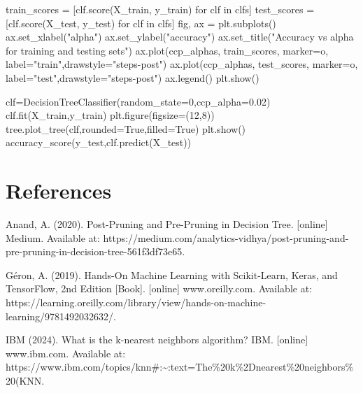 \documentclass[
  letterpaper,
  DIV=11,
  numbers=noendperiod]{scrartcl}
\newenvironment{Shaded}{\begin{snugshade}}{\end{snugshade}}
\newcommand{\ControlFlowTok}[1]{\textcolor[rgb]{0.00,0.23,0.31}{#1}}
\newcommand{\DecValTok}[1]{\textcolor[rgb]{0.68,0.00,0.00}{#1}}
\newcommand{\FloatTok}[1]{\textcolor[rgb]{0.68,0.00,0.00}{#1}}
\newcommand{\KeywordTok}[1]{\textcolor[rgb]{0.00,0.23,0.31}{#1}}
\newcommand{\NormalTok}[1]{\textcolor[rgb]{0.00,0.23,0.31}{#1}}
\newcommand{\OperatorTok}[1]{\textcolor[rgb]{0.37,0.37,0.37}{#1}}
\newcommand{\StringTok}[1]{\textcolor[rgb]{0.13,0.47,0.30}{#1}}
\newcommand{\VariableTok}[1]{\textcolor[rgb]{0.07,0.07,0.07}{#1}}
\begin{document}
\begin{Shaded}
\begin{Highlighting}[]
\NormalTok{train\_scores }\OperatorTok{=}\NormalTok{ [clf.score(X\_train, y\_train) }\ControlFlowTok{for}\NormalTok{ clf }\KeywordTok{in}\NormalTok{ clfs]}
\NormalTok{test\_scores }\OperatorTok{=}\NormalTok{ [clf.score(X\_test, y\_test) }\ControlFlowTok{for}\NormalTok{ clf }\KeywordTok{in}\NormalTok{ clfs]}
\NormalTok{fig, ax }\OperatorTok{=}\NormalTok{ plt.subplots()}
\NormalTok{ax.set\_xlabel(}\StringTok{"alpha"}\NormalTok{)}
\NormalTok{ax.set\_ylabel(}\StringTok{"accuracy"}\NormalTok{)}
\NormalTok{ax.set\_title(}\StringTok{"Accuracy vs alpha for training and testing sets"}\NormalTok{)}
\NormalTok{ax.plot(ccp\_alphas, train\_scores, marker}\OperatorTok{=}\StringTok{\textquotesingle{}o\textquotesingle{}}\NormalTok{, label}\OperatorTok{=}\StringTok{"train"}\NormalTok{,drawstyle}\OperatorTok{=}\StringTok{"steps{-}post"}\NormalTok{)}
\NormalTok{ax.plot(ccp\_alphas, test\_scores, marker}\OperatorTok{=}\StringTok{\textquotesingle{}o\textquotesingle{}}\NormalTok{, label}\OperatorTok{=}\StringTok{"test"}\NormalTok{,drawstyle}\OperatorTok{=}\StringTok{"steps{-}post"}\NormalTok{)}
\NormalTok{ax.legend()}
\NormalTok{plt.show()}
\end{Highlighting}
\end{Shaded}

\begin{Shaded}
\begin{Highlighting}[]
\NormalTok{clf}\OperatorTok{=}\NormalTok{DecisionTreeClassifier(random\_state}\OperatorTok{=}\DecValTok{0}\NormalTok{,ccp\_alpha}\OperatorTok{=}\FloatTok{0.02}\NormalTok{)}
\NormalTok{clf.fit(X\_train,y\_train)}
\NormalTok{plt.figure(figsize}\OperatorTok{=}\NormalTok{(}\DecValTok{12}\NormalTok{,}\DecValTok{8}\NormalTok{))}
\NormalTok{tree.plot\_tree(clf,rounded}\OperatorTok{=}\VariableTok{True}\NormalTok{,filled}\OperatorTok{=}\VariableTok{True}\NormalTok{)}
\NormalTok{plt.show()}
\NormalTok{accuracy\_score(y\_test,clf.predict(X\_test))}
\end{Highlighting}
\end{Shaded}

\section{References}\label{references}

Anand, A. (2020). Post-Pruning and Pre-Pruning in Decision Tree.
{[}online{]} Medium. Available at:
https://medium.com/analytics-vidhya/post-pruning-and-pre-pruning-in-decision-tree-561f3df73e65.

Géron, A. (2019). Hands-On Machine Learning with Scikit-Learn, Keras,
and TensorFlow, 2nd Edition {[}Book{]}. {[}online{]} www.oreilly.com.
Available at:
https://learning.oreilly.com/library/view/hands-on-machine-learning/9781492032632/.

IBM (2024). What is the k-nearest neighbors algorithm? \textbar{} IBM.
{[}online{]} www.ibm.com. Available at:
https://www.ibm.com/topics/knn\#:\textasciitilde:text=The\%20k\%2Dnearest\%20neighbors\%20(KNN.
\end{document}
